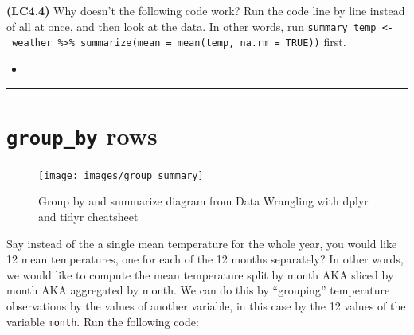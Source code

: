 \documentclass[12pt, krantz2,]{krantz}
\makeatletter
\newenvironment{Shaded}{\begin{snugshade}}{\end{snugshade}}
\newcommand{\DataTypeTok}[1]{\textcolor[rgb]{0.27,0.27,0.27}{#1}}
\newcommand{\KeywordTok}[1]{\textcolor[rgb]{0.27,0.27,0.27}{\textbf{#1}}}
\newcommand{\NormalTok}[1]{#1}
\newcommand{\OperatorTok}[1]{\textcolor[rgb]{0.43,0.43,0.43}{\textbf{#1}}}
\newcommand{\OtherTok}[1]{\textcolor[rgb]{0.37,0.37,0.37}{#1}}
\newcommand{\StringTok}[1]{\textcolor[rgb]{0.5,0.5,0.5}{#1}}
\newenvironment{kframe}{%
\medskip{}
\setlength{\fboxsep}{.8em}
 \def\at@end@of@kframe{}%
 \ifinner\ifhmode%
  \def\at@end@of@kframe{\end{minipage}}%
  \begin{minipage}{\columnwidth}%
 \fi\fi%
 \def\FrameCommand##1{\hskip\@totalleftmargin \hskip-\fboxsep
 \colorbox{shadecolor}{##1}\hskip-\fboxsep
     \hskip-\linewidth \hskip-\@totalleftmargin \hskip\columnwidth}%
 \MakeFramed {\advance\hsize-\width
   \@totalleftmargin\z@ \linewidth\hsize
   \@setminipage}}%
 {\par\unskip\endMakeFramed%
 \at@end@of@kframe}
\renewenvironment{Shaded}{\begin{kframe}}{\end{kframe}}
\newenvironment{rmdblock}[1]
  {\begin{shaded*}
  \begin{itemize}
  \renewcommand{\labelitemi}{
    \raisebox{-.7\height}[0pt][0pt]{
    }
  }
  \item
  }
  {
  \end{itemize}
  \end{shaded*}
  }
\newenvironment{learncheck}
  {\begin{rmdblock}{warning}}
  {\end{rmdblock}}
\makeatother
\begin{document}
\textbf{(LC4.4)} Why doesn't the following code work? Run the code line by line instead of all at once, and then look at the data. In other words, run \texttt{summary\_temp\ \textless{}-\ weather\ \%\textgreater{}\%\ summarize(mean\ =\ mean(temp,\ na.rm\ =\ TRUE))} first.

\begin{Shaded}
\end{Shaded}

\begin{learncheck}

\end{learncheck}

\begin{center}\rule{0.5\linewidth}{\linethickness}\end{center}

\hypertarget{groupby}{%
\section{\texorpdfstring{\texttt{group\_by} rows}{group\_by rows}}\label{groupby}}

\begin{figure}

{\centering \texttt{[image: images/group\_summary]} 

}

\caption{Group by and summarize diagram from Data Wrangling with dplyr and tidyr cheatsheet}\label{fig:groupsummarize}
\end{figure}

Say instead of the a single mean temperature for the whole year, you would like 12 mean temperatures, one for each of the 12 months separately? In other words, we would like to compute the mean temperature split by month AKA sliced by month AKA aggregated by month. We can do this by ``grouping'' temperature observations by the values of another variable, in this case by the 12 values of the variable \texttt{month}. Run the following code:
\end{document}
